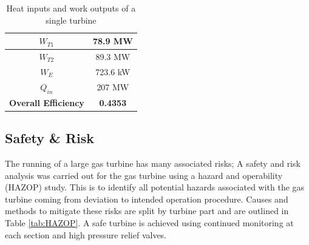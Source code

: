   \begin{table} [h]
\begin{center}
\caption{Heat inputs and work outputs of a single turbine} \label{tab:powerdata}
\begin{tabular}{ |c|c| }
 \hline
  $W_{T1}$ & 78.9 MW\\ 
 \hline
  $W_{T2}$ & 89.3 MW\\
  \hline
  $W_E$ & 723.6 kW\\
 \hline
 $Q_{in}$ & 207 MW\\
 \hline
 \textbf{Overall Efficiency} & \textbf{0.4353}\\ 
 \hline
\end{tabular}
\end{center}  
\end{table}

\pagebreak


\subsection{Safety \& Risk}
The running of a large gas turbine has many associated risks; A safety and risk analysis was carried out for the gas turbine using a hazard and operability (HAZOP) study. This is to identify all potential hazards associated with the gas turbine coming from deviation to intended operation procedure. Causes and methods to mitigate these risks are split by turbine part and are outlined in Table \ref{tab:HAZOP}. A safe turbine is achieved using continued monitoring at each section and high pressure relief valves.

